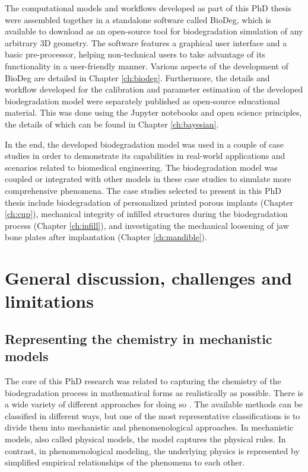 The computational models and workflows developed as part of this PhD thesis were assembled together in a standalone software called BioDeg, which is available to download as an open-source tool for biodegradation simulation of any arbitrary 3D geometry. The software features a graphical user interface and a basic pre-processor, helping non-technical users to take advantage of its functionality in a user-friendly manner. Various aspects of the development of BioDeg are detailed in Chapter \ref{ch:biodeg}. Furthermore, the details and workflow developed for the calibration and parameter estimation of the developed biodegradation model were separately published as open-source educational material. This was done using the Jupyter notebooks and open science principles, the details of which can be found in Chapter \ref{ch:bayesian}.

In the end, the developed biodegradation model was used in a couple of case studies in order to demonstrate its capabilities in real-world applications and scenarios related to biomedical engineering. The biodegradation model was coupled or integrated with other models in these case studies to simulate more comprehensive phenomena. The case studies selected to present in this PhD thesis include biodegradation of personalized printed porous implants (Chapter \ref{ch:cup}), mechanical integrity of infilled structures during the biodegradation process (Chapter \ref{ch:infill}), and investigating the mechanical loosening of jaw bone plates after implantation (Chapter \ref{ch:mandible}).



\section{General discussion, challenges and limitations}

\subsection{Representing the chemistry in mechanistic models} \label{sec:conclusion_mechanistic}


The core of this PhD research was related to capturing the chemistry of the biodegradation process in mathematical forms as realistically as possible. There is a wide variety of different approaches for doing so \cite{Abdalla2020}. The available methods can be classified in different ways, but one of the most representative classifications is to divide them into mechanistic and phenomenological approaches. In mechanistic models, also called physical models, the model captures the physical rules. In contrast, in phenomenological modeling, the underlying physics is represented by simplified empirical relationships of the phenomena to each other.

